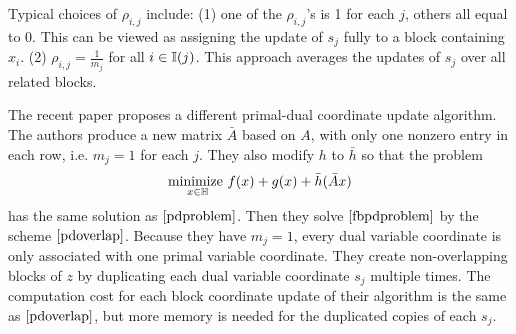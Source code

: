 {{{Typical choices of $\rho_{i,j}$ include: (1) one of the $\rho_{i,j}$'s is 1 for each $j$, others all equal to 0. This can be viewed as assigning  the update of $s_j$ fully to a block containing $x_i$.
(2) $\rho_{i,j}=\frac{1}{m_j}$ for all $i\in\mathbb{I}(j)$. This approach averages the updates of $s_j$ over all related blocks.

\begin{remark}
The recent paper \cite{fercoq2015coordinate} proposes a different primal-dual coordinate update algorithm.
The authors produce a new matrix $\bar{A}$ based on $A$, with only one nonzero entry in each row, i.e. $m_j=1$ for each $j$. They also modify $h$ to $\bar{h}$ so that the problem
\begin{equation}
\underset{x\in\mathbb{H}}{\textnormal{minimize }} f(x)+g(x)+\bar{h}(\bar{A}x)\label{fbpdproblem}
\end{equation}
has the same solution as $\eqref{pdproblem}$. Then they solve $\eqref{fbpdproblem}$ by the scheme $\eqref{pdoverlap}$. Because they have $m_j=1$, every dual variable coordinate is only associated with one primal variable coordinate.
They create non-overlapping blocks of $z$ by duplicating each dual variable coordinate $s_j$ multiple times. The computation cost for each block coordinate update of their algorithm is the same as $\eqref{pdoverlap}$, but  more memory is needed for the duplicated copies of each $s_j$.
\end{remark}


}}}
